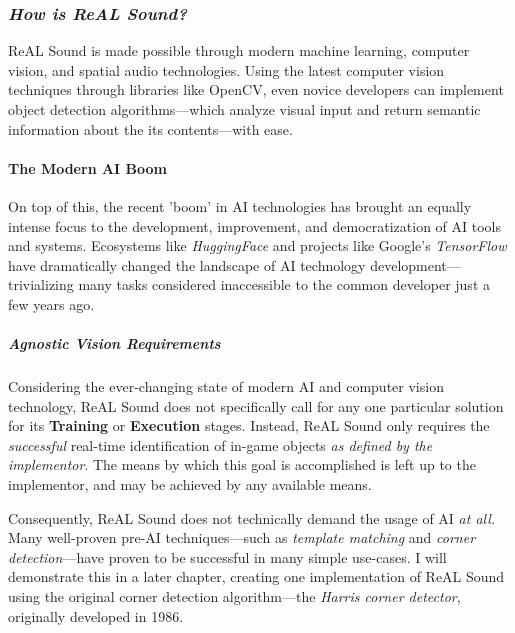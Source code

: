 \documentclass{report}
\newcommand{\rs}{ReAL Sound\xspace}
\begin{document}
\subsubsection{\emph{How is \rs?}}
\rs is made possible through modern machine learning, computer vision, and spatial audio technologies. Using the latest computer vision techniques through libraries like OpenCV\cite{opencv_library}, even novice developers can implement object detection algorithms---which analyze visual input and return semantic information about the its contents---with ease. 

\paragraph{The Modern AI Boom}

On top of this, the recent 'boom' in AI technologies\cite{Knight_2023}\cite{Meredith_2023} has brought an equally intense focus to the development, improvement, and democratization of AI tools and systems\cite{Brynjolfsson_McAfee_2017}\cite{Heikkilä_2022}. Ecosystems like \emph{HuggingFace}\cite{Wiggers_2022} and projects like Google's \emph{TensorFlow}\cite{tensorflow2015-whitepaper} have dramatically changed the landscape of AI technology development---trivializing many tasks considered inaccessible to the common developer just a few years ago.

\subparagraph{Agnostic Vision Requirements}

Considering the ever-changing state of modern AI and computer vision technology, \rs does not specifically call for any one particular solution for its \textbf{Training} or \textbf{Execution} stages. Instead, \rs only requires the \emph{successful} real-time identification of in-game objects \textit{as defined by the implementor}. The means by which this goal is accomplished is left up to the implementor, and may be achieved by any available means. 

Consequently, \rs does not technically demand the usage of AI \emph{at all.} Many well-proven pre-AI techniques---such as \emph{template matching}\cite{Brunelli2009-gh} and \emph{corner detection}\cite{Hildreth1980}---have proven to be successful in many simple use-cases. I will demonstrate this in a later chapter, creating one  implementation of \rs using the original corner detection algorithm---the \emph{Harris corner detector}\cite{Harris}, originally developed in 1986. 
\end{document}
